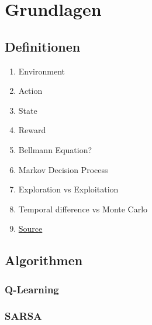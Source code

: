 \section{Grundlagen}


\subsection{Definitionen}

\begin{enumerate}
    \item Environment
    \item Action
    \item State
    \item Reward
    \item Bellmann Equation?
    \item Markov Decision Process
    \item Exploration vs Exploitation
    \item Temporal difference vs Monte Carlo
    \item \href{https://blog.floydhub.com/an-introduction-to-q-learning-reinforcement-learning/}{Source} 
\end{enumerate}

\subsection{Algorithmen}

\subsubsection{Q-Learning}

\subsubsection{SARSA}